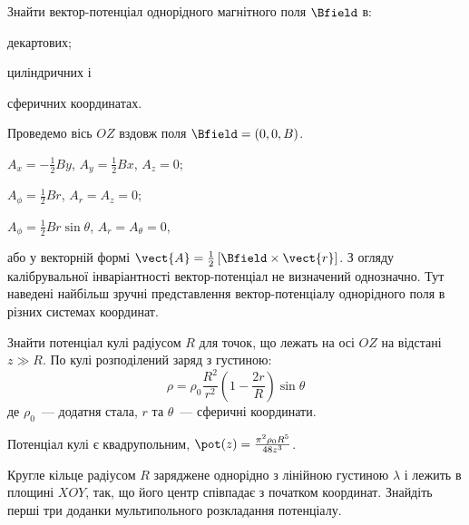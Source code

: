 
\begin{problem}
Знайти вектор-потенціал однорідного магнітного поля $\Bfield$ в:
\begin{enumerate*}[label=\alph*)]
	\item декартових;
	\item циліндричних і
	\item сферичних координатах.
\end{enumerate*}
\begin{solution}
	Проведемо вісь $OZ$ вздовж поля $\Bfield = (0, 0, B)$.
	\begin{enumerate*}[label=\alph*)]
		\item $A_x = -\frac12 By$, $A_y = \frac12 Bx$, $A_z = 0$;
		\item $A_{\phi} = \frac12 Br$, $A_r = A_z = 0$;
		\item $A_{\phi} = \frac12 Br\sin\theta$, $A_r = A_{\theta} = 0$,
	\end{enumerate*}
або у векторній формі 	$\vect{A} = \frac12 \left[ \Bfield\times \vect{r} \right] $.
	З огляду калібрувальної інваріантності вектор-потенціал не визначений однозначно. Тут наведені найбільш зручні представлення вектор-потенціалу однорідного поля в різних системах координат.
\end{solution}
\end{problem}

\begin{problem}%
Знайти потенціал кулі радіусом $R$ для точок, що лежать на осі $OZ$ на відстані $z \gg R$. По кулі розподілений заряд з густиною:
\[
	\rho = \rho_0 \frac{R^2}{r^2}\left( 1 - \frac{2r}{R}\right)\sin\theta
\]
де $\rho_0$~--- додатня стала, $r$ та $\theta$~--- сферичні координати.
\begin{solution}
	Потенціал кулі є квадрупольним, $\pot(z) = \frac{\pi^2\rho_0 R^5}{48z^3}$.
\end{solution}
\end{problem}

\begin{problem}%
Кругле кільце радіусом $R$ заряджене однорідно з лінійною густиною $\lambda$ і лежить в площині $XOY$, так, що його центр співпадає з початком координат. Знайдіть перші три доданки мультипольного розкладання потенціалу.
\end{problem}

